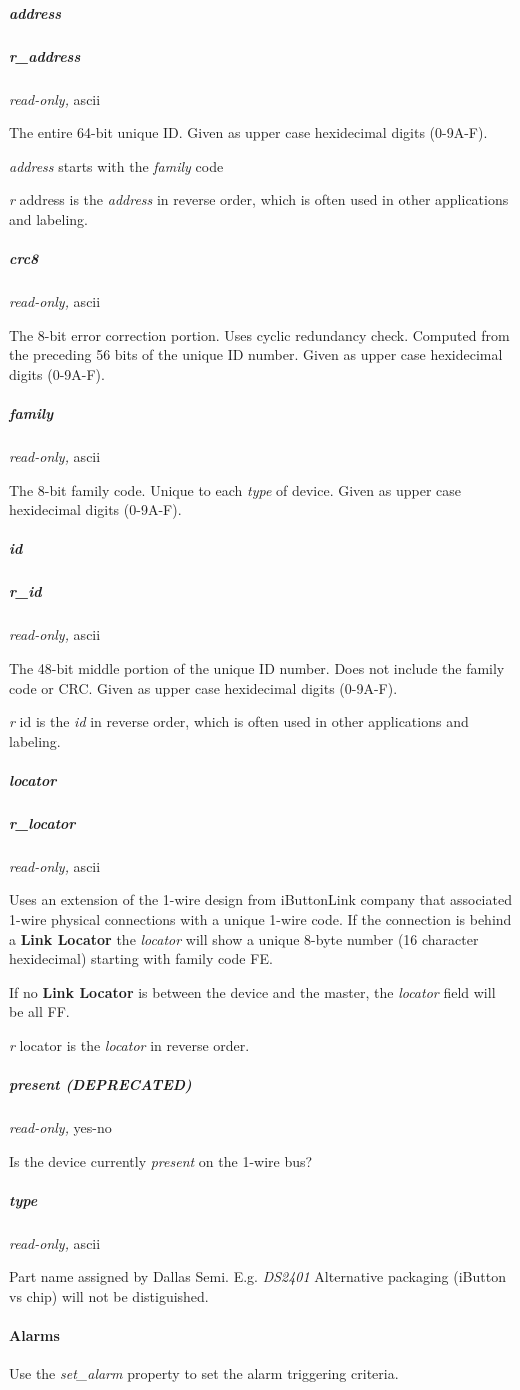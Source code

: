 \subparagraph*{address}
\subparagraph*{r\_address}\textit{read-only,} ascii


The entire 64-bit unique ID. Given as upper case hexidecimal digits (0-9A-F).


\textit{address} starts with the \textit{family} code 

\textit{r} address is the \textit{address} in reverse order, which is often used in other
applications and labeling. 
\subparagraph*{crc8}\textit{read-only,} ascii 

The 8-bit error correction portion. Uses cyclic redundancy check. Computed
from the preceding 56 bits of the unique ID number. Given as upper case
hexidecimal digits (0-9A-F). 
\subparagraph*{family}\textit{read-only,} ascii 

The 8-bit family code. Unique to each \textit{type} of device. Given as upper case
hexidecimal digits (0-9A-F). 
\subparagraph*{id}
\subparagraph*{r\_id}\textit{read-only,} ascii 

The 48-bit middle portion of the unique ID number. Does not include the family
code or CRC. Given as upper case hexidecimal digits (0-9A-F). 

\textit{r} id is the \textit{id} in reverse order, which is often used in other applications
and labeling. 
\subparagraph*{locator}
\subparagraph*{r\_locator}\textit{read-only,} ascii 

Uses an extension of the 1-wire design from iButtonLink company that associated
1-wire physical connections with a unique 1-wire code. If the connection is
behind a \textbf{Link Locator} the \textit{locator} will show a unique 8-byte number (16 character
hexidecimal) starting with family code FE. 

If no \textbf{Link Locator} is between the device and the master, the \textit{locator} field
will be all FF. 

\textit{r} locator is the \textit{locator} in reverse order. 
\subparagraph*{present (DEPRECATED)}\textit{read-only,}
yes-no 

Is the device currently \textit{present} on the 1-wire bus? 
\subparagraph*{type}\textit{read-only,} ascii 

Part name assigned by Dallas Semi. E.g. \textit{DS2401} Alternative packaging (iButton
vs chip) will not be distiguished.  
\paragraph*{Alarms}
Use the \textit{set\_alarm} property to
set the alarm triggering criteria. 
